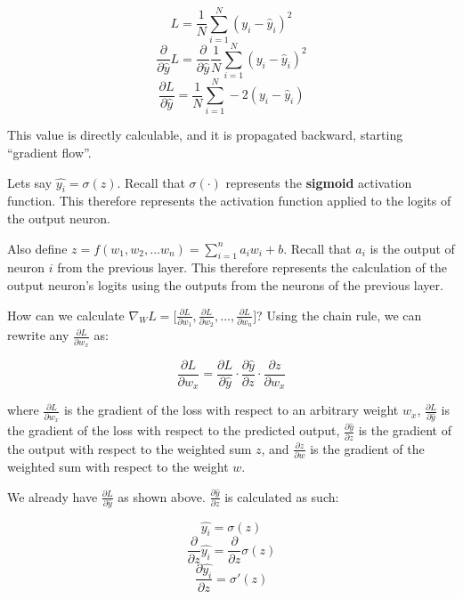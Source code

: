     $$L = \frac{1}{N} \sum^{N}_{i=1} (y_i - \hat{y}_i)^2$$
    $$\frac{\partial}{\partial \hat{y}} L = \frac{\partial}{\partial \hat{y}}  \frac{1}{N} \sum^{N}_{i=1} (y_i - \hat{y}_i)^2$$
    $$\frac{\partial L}{\partial \hat{y}} =  \frac{1}{N} \sum^{N}_{i=1} -2(y_i - \hat{y}_i)$$

    This value is directly calculable, and it is propagated backward, starting ``gradient flow''. 

    Lets say $\hat{y_i} = \sigma(z)$. Recall that $\sigma(\cdot)$ represents the \textbf{sigmoid} activation function. This therefore represents the activation function applied to the logits of the output neuron. 
    
    Also define $z = f(w_1, w_2, ... w_n) = \sum_{i=1}^n a_iw_i + b$. Recall that $a_i$ is the output of neuron $i$ from the previous layer. This therefore represents the calculation of the output neuron's logits using the outputs from the neurons of the previous layer. 
    


    How can we calculate $\nabla_W L = \biggl[ \frac{\partial L}{\partial w_1}, \frac{\partial L}{\partial w_2},...,  \frac{\partial L}{\partial w_n}\biggr]$? Using the chain rule, we can rewrite any $\frac{\partial L}{\partial w_x}$ as:

    $$\frac{\partial L}{\partial w_x} = \frac{\partial L}{\partial \hat{y}}\cdot\frac{\partial \hat{y}}{\partial z}\cdot\frac{\partial z}{\partial w_x}$$
    
    where $\frac{\partial L}{\partial w_x}$ is the gradient of the loss with respect to an arbitrary weight $w_x$, $\frac{\partial L}{\partial\hat{y}}$ is the gradient of the loss with respect to the predicted output, $\frac{\partial\hat{y}}{\partial z}$ is the gradient of the output with respect to the weighted sum $z$, and $\frac{\partial z}{\partial w}$ is the gradient of the weighted sum with respect to the weight $w$. 

    We already have $\frac{\partial L}{\partial\hat{y}}$ as shown above. $\frac{\partial \hat{y}}{\partial z}$ is calculated as such:

    $$\hat{y_i} = \sigma(z)$$
    $$\frac{\partial}{\partial z}\hat{y_i} = \frac{\partial}{\partial z} \sigma(z)$$
    $$\frac{\partial \hat{y_i}}{\partial z} = \sigma'(z)$$


